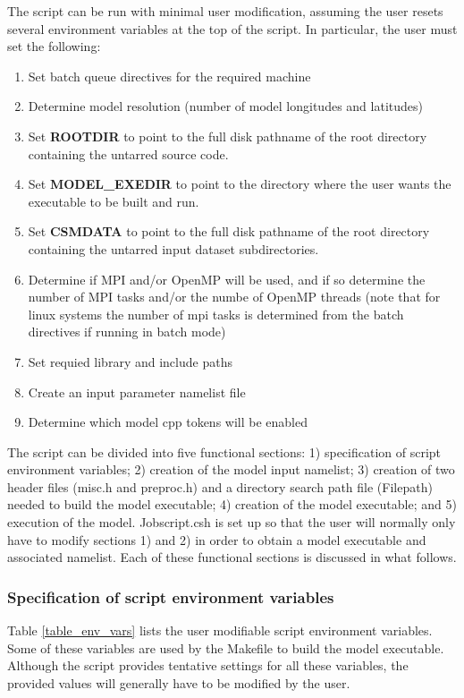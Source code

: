 The script can be run with minimal user modification, assuming the
user resets several environment variables at the top of the script.
In particular, the user must set the following:
\begin{enumerate}
\item Set batch queue directives for the required machine
\item Determine model resolution (number of model longitudes and latitudes)
\item Set {\bf ROOTDIR} to point to the full disk pathname of the root 
      directory containing the untarred source code. 
\item Set {\bf MODEL\_EXEDIR} to point to the directory where the user 
      wants the executable to be built and run.
\item Set {\bf CSMDATA} to point to the full disk pathname of the root directory 
      containing the untarred input dataset subdirectories.
\item Determine if MPI and/or OpenMP will be used, and if so determine the
      number of MPI tasks and/or the numbe of OpenMP threads
      (note that for linux systems the number of mpi tasks is determined
       from the batch directives if running in batch mode)
\item Set requied library and include paths
\item Create an input parameter namelist file
\item Determine which model cpp tokens will be enabled
\end{enumerate}

The script can be divided into five functional sections: 1)
specification of script environment variables; 2) creation of the
model input namelist; 3) creation of two header files (misc.h and
preproc.h) and a directory search path file (Filepath) needed to build
the model executable; 4) creation of the model executable; and 5)
execution of the model. Jobscript.csh is set up so that the user will
normally only have to modify sections 1) and 2) in order to obtain a
model executable and associated namelist.  Each of these functional
sections is discussed in what follows.

\subsubsection {Specification of script environment variables}
\label{subsubsec_env_vars}
 
Table \ref{table_env_vars} lists the user modifiable script
environment variables. Some of these variables are used by the
Makefile to build the model executable.  Although the script provides
tentative settings for all these variables, the provided values will
generally have to be modified by the user.


